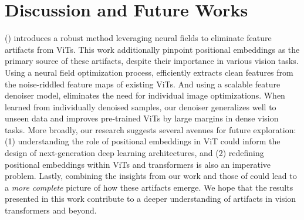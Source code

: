 \section{Discussion and Future Works}
\label{sec:discussion}

\ourslong (\ours) introduces a robust method leveraging neural fields to eliminate feature artifacts from ViTs. This work additionally pinpoint positional embeddings as the primary source of these artifacts, despite their importance in various vision tasks. Using a neural field optimization process, \ours efficiently extracts clean features from the noise-riddled feature maps of existing ViTs. And using a scalable feature denoiser model, \ours eliminates the need for individual image optimizations. When learned from individually denoised samples, our denoiser generalizes well to unseen data and improves pre-trained ViTs by large margins in dense vision tasks. More broadly, our research suggests several avenues for future exploration: (1) understanding the role of positional embeddings in ViT could inform the design of next-generation deep learning architectures, and (2) redefining positional embeddings within ViTs and transformers is also an imperative problem. Lastly, combining the insights from our work and those of \cite{darcet2023vision} could lead to a \textit{more complete} picture of how these artifacts emerge. We hope that the results presented in this work contribute to a deeper understanding of artifacts in vision transformers and beyond.
